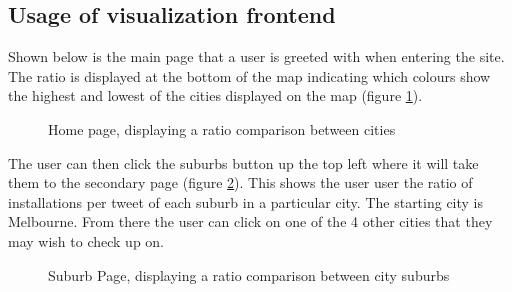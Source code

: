 \documentclass[11pt, oneside]{article}
\begin{document}
\subsection{Usage of visualization frontend}
Shown below is the main page that a user is greeted with when entering the site. The ratio is displayed at the bottom of the map indicating which colours show the highest and lowest of the cities displayed on the map (figure \ref{fig:cities_visualization}).
\newline
\newline
\begin{figure}
  \begin{center}
  \end{center}
  \caption{Home page, displaying a ratio comparison between cities}
  \label{fig:cities_visualization}
\end{figure}
The user can then click the suburbs button up the top left where it will take them to the secondary page (figure \ref{fig:melbourne_suburbs_visualization}). This shows the user user the ratio of installations per tweet of each suburb in a particular city. The starting city is Melbourne. From there the user can click on one of the 4 other cities that they may wish to check up on. 
\newline
\newline
\begin{figure}
  \begin{center}
  \end{center}
  \caption{Suburb Page, displaying a ratio comparison between city suburbs}
  \label{fig:melbourne_suburbs_visualization}
\end{figure}
\end{document}
